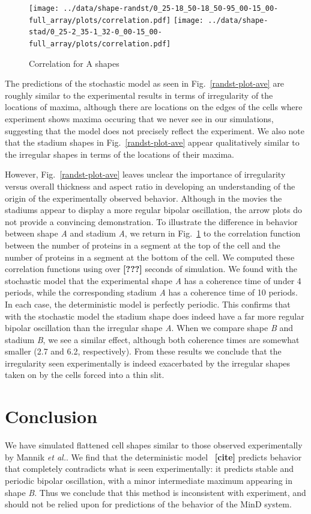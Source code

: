 \documentclass[letterpaper,twocolumn,amsmath,amssymb,pre]{revtex4-1}
\newcommand{\red}[1]{{\bf \color{red} #1}}
\newcommand{\fixme}[1]{\red{[#1]}}
\begin{document}
\begin{figure}
  \texttt{[image: ../data/shape-randst/0\_25-18\_50-18\_50-95\_00-15\_00-full\_array/plots/correlation.pdf]}
  \texttt{[image: ../data/shape-stad/0\_25-2\_35-1\_32-0\_00-15\_00-full\_array/plots/correlation.pdf]}
  \caption{Correlation for A shapes}
  \label{fig:corr-pancake-A}
\end{figure}

The predictions of the stochastic model as seen in
Fig.~\ref{randst-plot-ave} are roughly similar to the experimental
results in terms of irregularity of the locations of maxima, although
there are locations on the edges of the cells where experiment shows
maxima occuring that we never see in our simulations, suggesting that
the model does not precisely reflect the experiment.  We also note
that the stadium shapes in Fig.~\ref{randst-plot-ave} appear
qualitatively similar to the irregular shapes in terms of the
locations of their maxima.

However, Fig.~\ref{randst-plot-ave} leaves unclear the importance of
irregularity versus overall thickness and aspect ratio in developing
an understanding of the origin of the experimentally observed
behavior.  Although in the movies the stadiums appear to display a
more regular bipolar oscillation, the arrow plots do not provide a
convincing demonstration.  To illustrate the difference in behavior
between shape \emph{A} and stadium \emph{A}, we return in
Fig.~\ref{fig:corr-pancake-A} to the correlation function between the
number of proteins in a segment at the top of the cell and the number
of proteins in a segment at the bottom of the cell.  We computed these
correlation functions using over \fixme{???} seconds of simulation.
We found with the stochastic model that the experimental shape
\emph{A} has a coherence time of under 4 periods, while the
corresponding stadium \emph{A} has a coherence time of 10 periods.  In
each case, the deterministic model is perfectly periodic. This
confirms that with the stochastic model the stadium shape does indeed
have a far more regular bipolar oscillation than the irregular shape
\emph{A}.  When we compare shape \emph{B} and stadium \emph{B}, we see
a similar effect, although both coherence times are somewhat smaller
(2.7 and 6.2, respectively).  From these results we conclude that the
irregularity seen experimentally is indeed exacerbated by the
irregular shapes taken on by the cells forced into a thin slit.

\section{Conclusion}
We have simulated flattened cell shapes similar to those observed
experimentally by Mannik \emph{et al.}.  We find that the
deterministic model~\fixme{cite} predicts behavior that completely
contradicts what is seen experimentally: it predicts stable and
periodic bipolar oscillation, with a minor intermediate maximum
appearing in shape \emph{B}.  Thus we conclude that this method is
inconsistent with experiment, and should not be relied upon for
predictions of the behavior of the MinD system.
\end{document}
